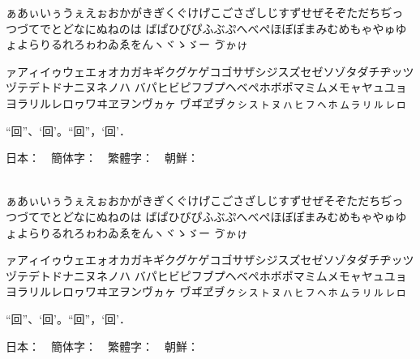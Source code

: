 \documentclass[a4paper,titlepage, draft]{\class}
\begin{document}
\makeatletter\if@deluxe
{\gtfamily\ebseries%
[gt/eb]

ぁあぃいぅうぇえぉおかがきぎくぐけげこごさざしじすずせぜそぞただちぢっつづてでとどなにぬねのは
ばぱひびぴふぶぷへべぺほぼぽまみむめもゃやゅゆょよらりるれろゎわゐゑをんヽヾゝゞー
\ifuptexmode
ゔゕゖ
\fi

ァアィイゥウェエォオカガキギクグケゲコゴサザシジスズセゼソゾタダチヂッツヅテデトドナニヌネノハ
バパヒビピフブプヘベペホボポマミムメモャヤュユョヨラリルレロヮワヰヱヲンヴヵヶ
\ifuptexmode
ヷヸヹヺㇰㇱㇲㇳㇴㇵㇶㇷㇸㇹㇺㇻㇼㇽㇾㇿ
\fi

“回”、‘回’。“回”，‘回’．

日本：~~簡体字：~~繁體字：~~朝鮮：\\
~~%
~~%
}

{\mgfamily
[mg/m]

ぁあぃいぅうぇえぉおかがきぎくぐけげこごさざしじすずせぜそぞただちぢっつづてでとどなにぬねのは
ばぱひびぴふぶぷへべぺほぼぽまみむめもゃやゅゆょよらりるれろゎわゐゑをんヽヾゝゞー
\ifuptexmode
ゔゕゖ
\fi

ァアィイゥウェエォオカガキギクグケゲコゴサザシジスズセゼソゾタダチヂッツヅテデトドナニヌネノハ
バパヒビピフブプヘベペホボポマミムメモャヤュユョヨラリルレロヮワヰヱヲンヴヵヶ
\ifuptexmode
ヷヸヹヺㇰㇱㇲㇳㇴㇵㇶㇷㇸㇹㇺㇻㇼㇽㇾㇿ
\fi

“回”、‘回’。“回”，‘回’．

日本：~~簡体字：~~繁體字：~~朝鮮：\\
~~%
~~%
}
\fi\makeatother
\end{document}

